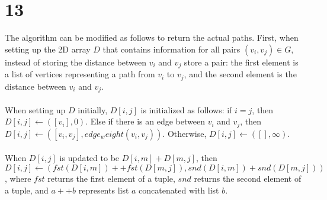 \documentclass[letterpaper,notitlepage,twoside]{article}
\begin{document}
\section*{13}
The algorithm can be modified as follows to return the actual paths. First, when setting up the 2D array $D$ that contains information for all pairs $(v_i, v_j) \in G$, instead of storing the distance between $v_i$ and $v_j$ store a pair: the first element is a list of vertices representing a path from $v_i$ to $v_j$, and the second element is the distance between $v_i$ and $v_j$.
\\\\
When setting up $D$ initially, $D[i, j]$ is initialized as follows: if $i = j$, then $D[i, j] \gets ([v_i], 0)$. Else if there is an edge between $v_i$ and $v_j$, then $D[i, j] \gets ([v_i, v_j], edge_weight(v_i, v_j))$. Otherwise, $D[i, j] \gets ([], \infty)$.
\\\\
When $D[i, j]$ is updated to be $D[i, m] + D[m, j]$, then $D[i, j] \gets (fst(D[i, m]) ++ fst(D[m, j]), snd(D[i, m]) + snd(D[m, j]))$, where $fst$ returns the first element of a tuple, $snd$ returns the second element of a tuple, and $a ++ b$ represents list $a$ concatenated with list $b$.
\end{document}
